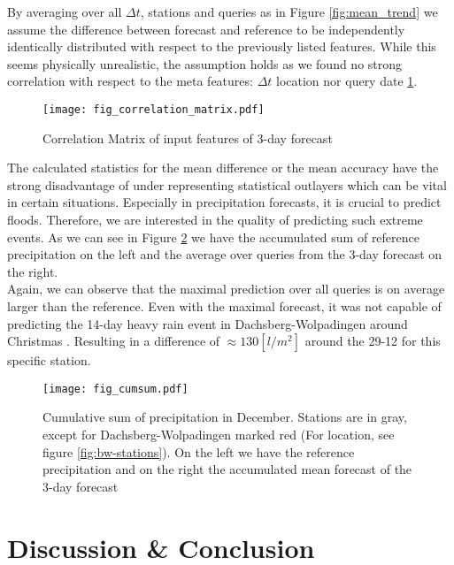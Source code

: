 \documentclass{article}
\theoremstyle{plain}
\theoremstyle{definition}
\theoremstyle{remark}
\begin{document}
By averaging over all $\Delta t$, stations and queries as in Figure
\ref{fig:mean_trend} we assume the difference between forecast and reference to
be independently identically distributed with respect to the previously listed
features. While this seems physically unrealistic, the assumption holds as we
found no strong correlation with respect to the meta features: $\Delta t$
location nor query date \ref{fig:corr_matrix}.

\begin{figure}[h]
    \centering
    \texttt{[image: fig\_correlation\_matrix.pdf]}
    \caption{Correlation Matrix of input features of 3-day forecast}
    \label{fig:corr_matrix}
\end{figure}

The calculated statistics for the mean difference or the mean accuracy have the
strong disadvantage of under representing statistical outlayers which can be
vital in certain situations. Especially in precipitation forecasts, it is
crucial to predict floods. Therefore, we are interested in the quality of
predicting such extreme events. As we can see in Figure
\ref{fig:cum_sum_heavy_rain} we have the accumulated sum of reference
precipitation on the left and the average over queries from the 3-day forecast
on the right. \\
Again, we can observe that the maximal prediction over all queries is on
average larger than the reference.
Even with the maximal forecast, it was not capable of predicting the 14-day
heavy rain event in Dachsberg-Wolpadingen around Christmas
\cite{flooding_christmas}. Resulting in a difference of  $\approx 130 [l /
            m^2]$ around the 29-12 for this specific station.


\begin{figure}[h]
    \centering
    \texttt{[image: fig\_cumsum.pdf]}
    \caption{Cumulative sum of precipitation in December. Stations are in gray,
        except for Dachsberg-Wolpadingen marked red (For location, see figure
        \ref{fig:bw-stations}). On the left we have the reference precipitation and on
        the right the accumulated mean forecast of the 3-day forecast}
    \label{fig:cum_sum_heavy_rain}
\end{figure}

\section{Discussion \& Conclusion}\label{sec:conclusion}
\end{document}
